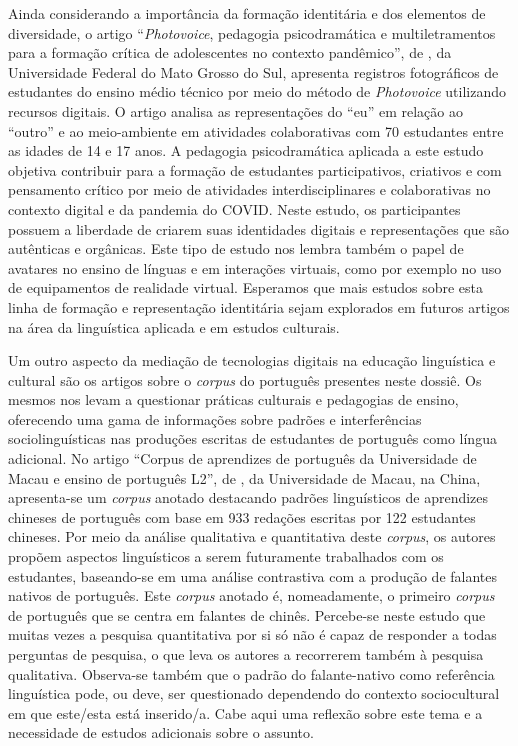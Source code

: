 \documentclass[portuguese]{textolivre}
\begin{document}
Ainda considerando a importância da formação identitária e dos elementos de diversidade,  o artigo “\textit{Photovoice}, pedagogia psicodramática e multiletramentos para a formação crítica de adolescentes no contexto pandêmico”, de \textcite{bomfim_photovoice_2024}, da Universidade Federal do Mato Grosso do Sul, apresenta registros fotográficos de estudantes do ensino médio técnico por meio do método de \textit{Photovoice} utilizando recursos digitais. O artigo analisa as representações do “eu” em relação ao “outro” e ao meio-ambiente em atividades colaborativas com 70 estudantes entre as idades de 14 e 17 anos. A pedagogia psicodramática aplicada a este estudo objetiva contribuir para a formação de estudantes participativos, criativos e com pensamento crítico por meio de atividades interdisciplinares e colaborativas no contexto digital e da pandemia do COVID. Neste estudo, os participantes possuem a liberdade de criarem suas identidades digitais e representações que são autênticas e orgânicas. Este tipo de estudo nos lembra também o papel de avatares no ensino de línguas e em interações virtuais, como por exemplo no uso de equipamentos de realidade virtual. Esperamos que mais estudos sobre esta linha de formação e representação identitária sejam explorados em futuros artigos na área da linguística aplicada e em estudos culturais.

Um outro aspecto da mediação de tecnologias digitais na educação linguística e cultural são os artigos sobre o \textit{corpus} do português presentes neste dossiê. Os mesmos nos levam a questionar práticas culturais e pedagogias de ensino, oferecendo uma gama de informações sobre padrões e interferências sociolinguísticas nas produções escritas de estudantes de português como língua adicional. No artigo “Corpus de aprendizes de português da Universidade de Macau e ensino de português L2”, de \textcite{zhang_corpus_2024}, da Universidade de Macau, na China, apresenta-se um \textit{corpus} anotado destacando padrões linguísticos de aprendizes chineses de português com base em 933 redações escritas por 122 estudantes chineses. Por meio da análise qualitativa e quantitativa deste \textit{corpus}, os autores propõem aspectos linguísticos a serem futuramente trabalhados com os estudantes, baseando-se em uma análise contrastiva com a produção de falantes nativos de português. Este \textit{corpus} anotado é, nomeadamente, o primeiro \textit{corpus} de português que se centra em falantes de chinês. Percebe-se neste estudo que muitas vezes a pesquisa quantitativa por si só não é capaz de responder a todas perguntas de pesquisa, o que leva os autores a recorrerem também à pesquisa qualitativa. Observa-se também que o padrão do falante-nativo como referência linguística pode, ou deve, ser questionado dependendo do contexto sociocultural em que este/esta está inserido/a. Cabe aqui uma reflexão sobre este tema e a necessidade de estudos adicionais sobre o assunto.
\end{document}
